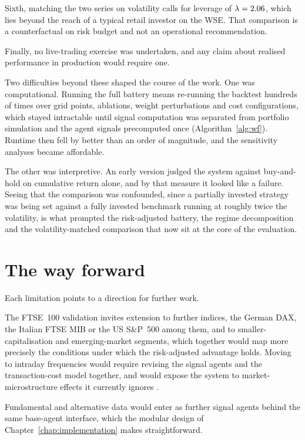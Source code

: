 Sixth, matching the two series on volatility calls for leverage of $\lambda = 2.06{}$, which lies beyond the reach of a typical retail investor on the WSE. That comparison is a counterfactual on risk budget and not an operational recommendation.

Finally, no live-trading exercise was undertaken, and any claim about realised performance in production would require one.

Two difficulties beyond these shaped the course of the work. One was computational. Running the full battery means re-running the backtest hundreds of times over grid points, ablations, weight perturbations and cost configurations, which stayed intractable until signal computation was separated from portfolio simulation and the agent signals precomputed once (Algorithm~\ref{alg:wf}). Runtime then fell by better than an order of magnitude, and the sensitivity analyses became affordable.

The other was interpretive. An early version judged the system against buy-and-hold on cumulative return alone, and by that measure it looked like a failure. Seeing that the comparison was confounded, since a partially invested strategy was being set against a fully invested benchmark running at roughly twice the volatility, is what prompted the risk-adjusted battery, the regime decomposition and the volatility-matched comparison that now sit at the core of the evaluation.

\section{The way forward}\label{sec:way_forward}

Each limitation points to a direction for further work.

The FTSE~100 validation invites extension to further indices, the German DAX, the Italian FTSE MIB or the US S\&P~500 among them, and to smaller-capitalisation and emerging-market segments, which together would map more precisely the conditions under which the risk-adjusted advantage holds. Moving to intraday frequencies would require revising the signal agents and the transaction-cost model together, and would expose the system to market-microstructure effects it currently ignores \cite{tusien2025mining}.

Fundamental and alternative data would enter as further signal agents behind the same base-agent interface, which the modular design of Chapter~\ref{chap:implementation} makes straightforward.

